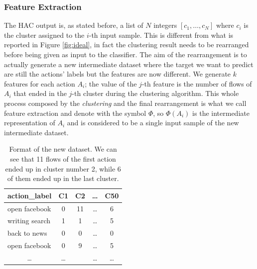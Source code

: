 \subsubsection{Feature Extraction}
\label{subsubsec:fexc}
The HAC output is, as stated before, a list of $N$ integers $[c_1,\dots, c_N]$ where $c_i$ is the cluster assigned to the $i$-th input sample. This is different from what is reported in Figure \ref{fig:ideal}, in fact the clustering result needs to be rearranged before being given as input to the classifier. The aim of the rearrangement is to actually generate a new intermediate dataset where the target we want to predict are still the actions' labels but the features are now different. We generate $k$ features for each action $A_i$; the value of the $j$-th feature is the number of flows of $A_i$ that ended in the $j$-th cluster during the clustering algorithm. This whole process composed by the \textit{clustering} and the final rearrangement is what we call feature extraction and denote with the symbol $\Phi$, so $\Phi(A_i)$ is the intermediate representation of $A_i$ and is considered to be a single input sample of the new intermediate dataset.

\begin{table}[]
\label{tab:newdataset}
\centering
\begin{tabular}{@{}lcccc@{}}
\toprule
\textbf{action\_label}     & \multicolumn{1}{l}{\textbf{C1}} & \multicolumn{1}{l}{\textbf{C2}} & \multicolumn{1}{l}{\textbf{\dots}} & \multicolumn{1}{l}{\textbf{C50}} \\ \midrule
open facebook              & 0                               & 11                              & \dots                              & 6                                \\
writing search             & 1                               & 1                               & \dots                              & 5                                \\
back to news               & 0                               & 0                               & \dots                              & 0                                \\
open facebook              & 0                               & 9                               & \dots                              & 5                                \\
\multicolumn{1}{c}{\dots} & \dots                          &                                 & \dots                             & \dots                           \\ \bottomrule
\end{tabular}
\caption{\small{Format of the new dataset. We can see that 11 flows of the first action ended up in cluster number 2, while 6 of them ended up in the last cluster.}}
\end{table}

